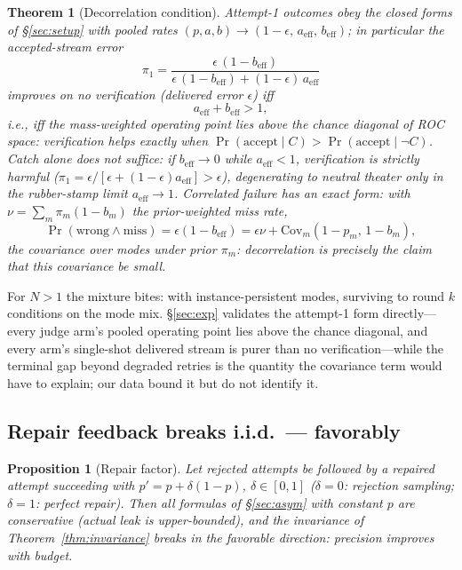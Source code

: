 \documentclass[11pt]{article}
\newtheorem{theorem}{Theorem}
\newtheorem{proposition}{Proposition}
\begin{document}
\begin{theorem}[Decorrelation condition]\label{thm:decorr}
Attempt-1 outcomes obey the closed forms of §\ref{sec:setup} with
pooled rates $(p,a,b) \to (1-\epsilon,\, a_{\mathrm{eff}},\,
b_{\mathrm{eff}})$; in particular the accepted-stream error
\[
\pi_1 = \frac{\epsilon\,(1-b_{\mathrm{eff}})}
{\epsilon\,(1-b_{\mathrm{eff}}) + (1-\epsilon)\,a_{\mathrm{eff}}}
\]
improves on no verification (delivered error $\epsilon$) iff
\[
a_{\mathrm{eff}} + b_{\mathrm{eff}} > 1,
\]
i.e., iff the mass-weighted operating point lies above the chance
diagonal of ROC space: verification helps exactly when
$\Pr(\text{accept}\mid C) > \Pr(\text{accept}\mid \neg C)$.  Catch
alone does not suffice: if $b_{\mathrm{eff}} \to 0$ while
$a_{\mathrm{eff}} < 1$, verification is \emph{strictly harmful}
($\pi_1 = \epsilon/[\epsilon+(1-\epsilon)a_{\mathrm{eff}}] >
\epsilon$), degenerating to neutral theater only in the
rubber-stamp limit $a_{\mathrm{eff}} \to 1$.  Correlated failure has
an exact form: with $\nu = \sum_m \pi_m(1-b_m)$ the prior-weighted
miss rate,
\[
\Pr(\text{wrong} \wedge \text{miss})
= \epsilon(1-b_{\mathrm{eff}})
= \epsilon\nu + \mathrm{Cov}_m(1-p_m,\,1-b_m),
\]
the covariance over modes under prior $\pi_m$: decorrelation is
precisely the claim that this covariance be small.
\end{theorem}

For $N>1$ the mixture bites: with instance-persistent modes,
surviving to round $k$ conditions on the mode mix.  §\ref{sec:exp}
validates the attempt-1 form directly---every judge arm's pooled
operating point lies above the chance diagonal, and every arm's
single-shot delivered stream is purer than no verification---while
the terminal gap beyond degraded retries is the quantity the
covariance term would have to explain; our data bound it but do
not identify it.

\subsection{Repair feedback breaks i.i.d.\ --- favorably}\label{sec:repair}

\begin{proposition}[Repair factor]\label{prop:delta}
Let rejected attempts be followed by a repaired attempt succeeding
with $p' = p + \delta(1-p)$, $\delta \in [0,1]$ ($\delta=0$:
rejection sampling; $\delta=1$: perfect repair).  Then all
formulas of §\ref{sec:asym} with constant $p$ are conservative
(actual leak is upper-bounded), and the invariance of
Theorem~\ref{thm:invariance} breaks in the favorable direction:
precision improves with budget.
\end{proposition}
\end{document}
